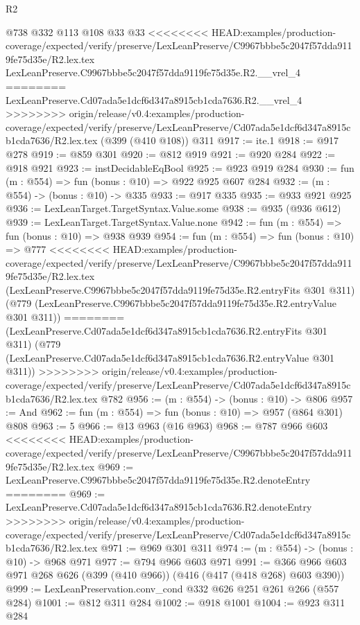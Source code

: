 \begin{lexlean}{R2}
\begin{coremodule}
{{{{{{{{{{{{{{{{{{{{{{    @738
    @332
    @113
    @108
    @33
    @33
<<<<<<<< HEAD:examples/production-coverage/expected/verify/preserve/LexLeanPreserve/C9967bbbe5c2047f57dda9119fe75d35e/R2.lex.tex
    LexLeanPreserve.C9967bbbe5c2047f57dda9119fe75d35e.R2.__vrel_4
========
    LexLeanPreserve.Cd07ada5e1dcf6d347a8915cb1cda7636.R2.__vrel_4
>>>>>>>> origin/release/v0.4:examples/production-coverage/expected/verify/preserve/LexLeanPreserve/Cd07ada5e1dcf6d347a8915cb1cda7636/R2.lex.tex
    (@399 (@410 @108))
    @311
@917 := ite.{1}
@918 := @917 @278
@919 := @859 @301
@920 := @812 @919
@921 := @920 @284
@922 := @918 @921
@923 := instDecidableEqBool
@925 := @923 @919 @284
@930 := fun (m : @554) => fun (bonus : @10) => @922 @925 @607 @284
@932 := (m : @554) -> (bonus : @10) -> @335
@933 := @917 @335
@935 := @933 @921 @925
@936 := LexLeanTarget.TargetSyntax.Value.some
@938 := @935 (@936 @612)
@939 := LexLeanTarget.TargetSyntax.Value.none
@942 := fun (m : @554) => fun (bonus : @10) => @938 @939
@954 := fun (m : @554) =>
  fun (bonus : @10) =>
  @777
<<<<<<<< HEAD:examples/production-coverage/expected/verify/preserve/LexLeanPreserve/C9967bbbe5c2047f57dda9119fe75d35e/R2.lex.tex
    (LexLeanPreserve.C9967bbbe5c2047f57dda9119fe75d35e.R2.entryFits @301 @311)
    (@779 (LexLeanPreserve.C9967bbbe5c2047f57dda9119fe75d35e.R2.entryValue @301 @311))
========
    (LexLeanPreserve.Cd07ada5e1dcf6d347a8915cb1cda7636.R2.entryFits @301 @311)
    (@779 (LexLeanPreserve.Cd07ada5e1dcf6d347a8915cb1cda7636.R2.entryValue @301 @311))
>>>>>>>> origin/release/v0.4:examples/production-coverage/expected/verify/preserve/LexLeanPreserve/Cd07ada5e1dcf6d347a8915cb1cda7636/R2.lex.tex
    @782
@956 := (m : @554) -> (bonus : @10) -> @806
@957 := And
@962 := fun (m : @554) => fun (bonus : @10) => @957 (@864 @301) @808
@963 := 5
@966 := @13 @963 (@16 @963)
@968 := @787 @966 @603
<<<<<<<< HEAD:examples/production-coverage/expected/verify/preserve/LexLeanPreserve/C9967bbbe5c2047f57dda9119fe75d35e/R2.lex.tex
@969 := LexLeanPreserve.C9967bbbe5c2047f57dda9119fe75d35e.R2.denoteEntry
========
@969 := LexLeanPreserve.Cd07ada5e1dcf6d347a8915cb1cda7636.R2.denoteEntry
>>>>>>>> origin/release/v0.4:examples/production-coverage/expected/verify/preserve/LexLeanPreserve/Cd07ada5e1dcf6d347a8915cb1cda7636/R2.lex.tex
@971 := @969 @301 @311
@974 := (m : @554) -> (bonus : @10) -> @968 @971
@977 := @794 @966 @603 @971
@991 := @366 @966 @603 @971 @268 @626 (@399 (@410 @966)) (@416 (@417 (@418 @268) @603 @390))
@999 := LexLeanPreservation.conv_cond @332 @626 @251 @261 @266 (@557 @284)
@1001 := @812 @311 @284
@1002 := @918 @1001
@1004 := @923 @311 @284
}}}}}}}}}}}}}}}}}}}}}}
\end{coremodule}
\end{lexlean}
